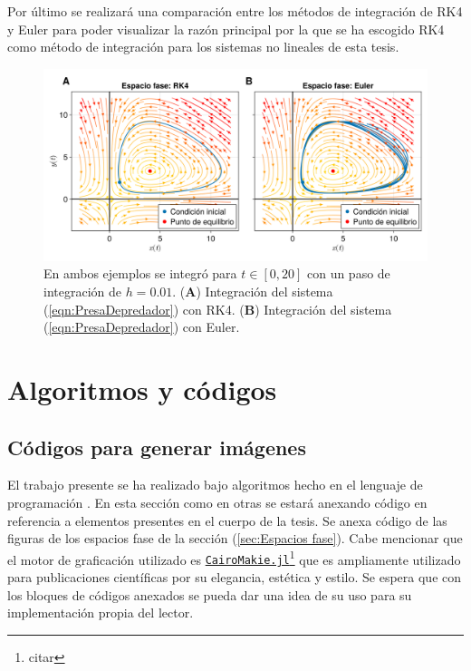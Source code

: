 Por último se realizará una comparación entre los métodos de integración de RK4 y Euler para poder visualizar la razón principal por la que se ha escogido RK4 como método de integración para los sistemas no lineales de esta tesis.
\begin{figure}[h!]
	\centering
	\includegraphics[scale=0.21]{../Imagenes/RK4vsEuler}
	\caption{En ambos ejemplos se integró para $t\in[0,20]$ con un paso de integración de $h=0.01$. (\textbf{A}) Integración del sistema (\ref{eqn:PresaDepredador}) con RK4. (\textbf{B}) Integración del sistema (\ref{eqn:PresaDepredador}) con Euler.}
	\label{fig:Rk4vsEuler}
\end{figure}

\section{Algoritmos y códigos}

\subsection{Códigos para generar imágenes}
El trabajo presente se ha realizado bajo algoritmos hecho en el lenguaje de programación \julia. En esta sección como en otras se estará anexando código en referencia a elementos presentes en el cuerpo de la tesis. Se anexa código de las figuras de los espacios fase de la sección (\ref{sec:Espacios fase}). Cabe mencionar que el motor de graficación utilizado es \href{https://github.com/JuliaPlots/CairoMakie.jl}{\texttt{CairoMakie.jl}}\footnote{citar} que es ampliamente utilizado para publicaciones científicas por su elegancia, estética y estilo. Se espera que con los bloques de códigos anexados se pueda dar una idea de su uso para su implementación propia del lector.

